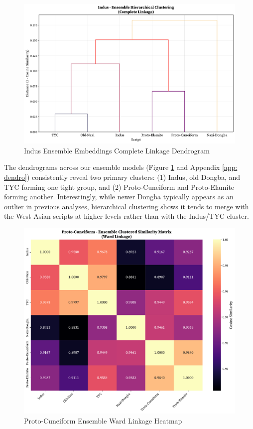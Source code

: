 \documentclass[11pt,a4paper,oneside]{report}
\begin{document}
\begin{figure}[H]  
    \centering
    \includegraphics[width=1\linewidth]{Visualizations/Dendrograms/Indus/ensemble_dendrogram_complete.pdf}
    \caption{Indus Ensemble Embeddings Complete Linkage Dendrogram}
    \label{fig:dendrogram}
\end{figure}

The dendrograms across our ensemble models (Figure \ref{fig:dendrogram} and Appendix \ref{app: dendro}) consistently reveal two primary clusters: (1) Indus, old Dongba, and TYC forming one tight group, and (2) Proto-Cuneiform and Proto-Elamite forming another. Interestingly, while newer Dongba typically appears as an outlier in previous analyses, hierarchical clustering shows it tends to merge with the West Asian scripts at higher levels rather than with the Indus/TYC cluster.

\begin{figure}[H]  
    \centering  
    \includegraphics[width=1\linewidth]{Visualizations/Clustered Heatmaps/Proto-Cuneiform/ensemble_clustered_similarity_ward.pdf}
    \caption{Proto-Cuneiform Ensemble Ward Linkage Heatmap}
    \label{fig:heatmap}
\end{figure}
\end{document}
